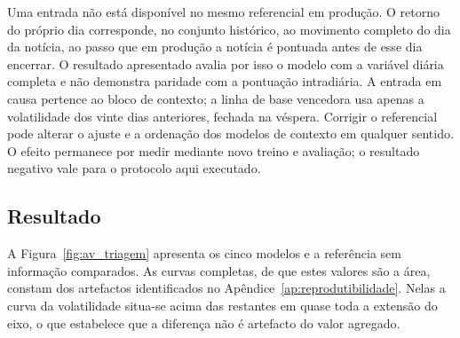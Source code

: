 Uma entrada não está disponível no mesmo referencial em produção. O retorno do próprio dia
corresponde, no conjunto histórico, ao movimento completo do dia da notícia, ao passo que em produção
a notícia é pontuada antes de esse dia encerrar. O resultado apresentado avalia por isso o modelo com
a variável diária completa e não demonstra paridade com a pontuação intradiária. A entrada em causa
pertence ao bloco de contexto; a linha de base vencedora usa apenas a volatilidade dos vinte dias
anteriores, fechada na véspera. Corrigir o referencial pode alterar o ajuste e a ordenação dos
modelos de contexto em qualquer sentido. O efeito permanece por medir mediante novo treino e
avaliação; o resultado negativo vale para o protocolo aqui executado.

\subsection{Resultado}

A Figura~\ref{fig:av_triagem} apresenta os cinco modelos e a referência sem informação comparados. As curvas completas, de que estes valores são a área, constam dos artefactos identificados no
Apêndice~\ref{ap:reprodutibilidade}. Nelas a curva da volatilidade situa-se acima das restantes em
quase toda a extensão do eixo, o que estabelece que a diferença não é artefacto do valor agregado.

